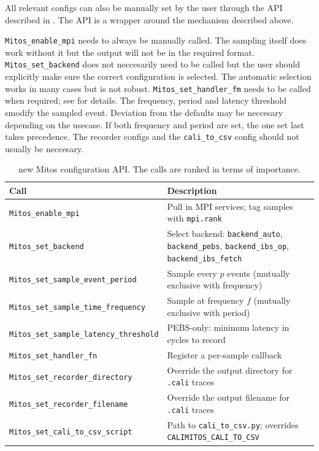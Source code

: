 All relevant configs can also be manually set by the user through the API described in . The API is a wrapper around the mechanism described above.

\texttt{Mitos\_enable\_mpi} needs to always be manually called. The sampling itself does work without it but the output will not be in the required format.
\texttt{Mitos\_set\_backend} does not neccesarily need to be called but the user should explicitly make sure the correct configuration is selected. The automatic selection works in many cases but is not robust.
\texttt{Mitos\_set\_handler\_fm} needs to be called when required; see  for details.
The frequency, period and latency threshold smodify the sampled event. Deviation from the defaults may be neccesary depending on the usecase. If both frequency and period are set, the one set last takes precedence.
The recorder configs and the \texttt{cali\_to\_csv} config should not usually be neccesary.

\begin{table}[h]
    \centering
    \small
    \begin{tabular}{@{}lp{7.5cm}@{}}
        \textbf{Call}                                   & \textbf{Description}                                                           \\
        \hline
        \texttt{Mitos\_enable\_mpi}                     & Pull in MPI services; tag samples with \texttt{mpi.rank}                       \\
        \texttt{Mitos\_set\_backend}                    & Select backend: \texttt{backend\_auto}, \texttt{backend\_pebs}, \texttt{backend\_ibs\_op}, \texttt{backend\_ibs\_fetch} \\
        \texttt{Mitos\_set\_sample\_event\_period}      & Sample every $p$ events (mutually exclusive with frequency)                    \\
        \texttt{Mitos\_set\_sample\_time\_frequency}    & Sample at frequency $f$ (mutually exclusive with period)                       \\
        \texttt{Mitos\_set\_sample\_latency\_threshold} & PEBS-only: minimum latency in cycles to record                                 \\
        \texttt{Mitos\_set\_handler\_fn}                & Register a per-sample callback                                                 \\
        \texttt{Mitos\_set\_recorder\_directory}        & Override the output directory for \texttt{.cali} traces                        \\
        \texttt{Mitos\_set\_recorder\_filename}         & Override the output filename for \texttt{.cali} traces                         \\
        \texttt{Mitos\_set\_cali\_to\_csv\_script}      & Path to \texttt{cali\_to\_csv.py}; overrides \texttt{CALIMITOS\_CALI\_TO\_CSV} \\
    \end{tabular}
    \caption{new Mitos configuration API. The calls are ranked in terms of importance.}
    \label{tab:calimitos-api}
\end{table}

